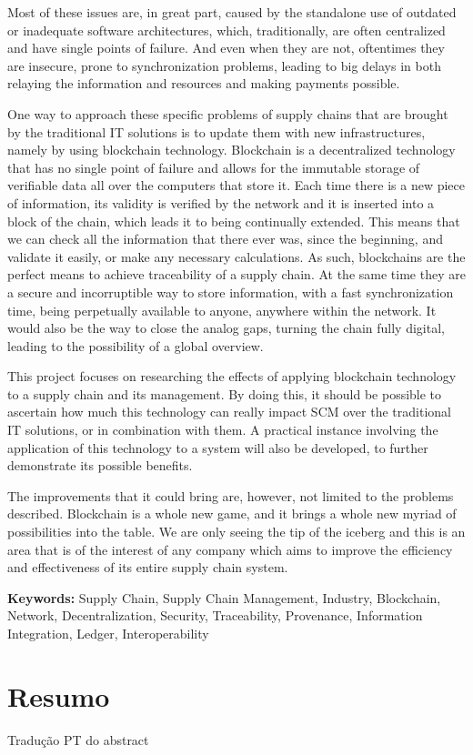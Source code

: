 Most of these issues are, in great part, caused by the standalone use of outdated or inadequate software architectures, which, traditionally, are often centralized and have single points of failure. And even when they are not, oftentimes they are insecure, prone to synchronization problems, leading to big delays in both relaying the information and resources and making payments possible. 

One way to approach these specific problems of supply chains that are brought by the traditional IT solutions is to update them with new infrastructures, namely by using blockchain technology. Blockchain is a decentralized technology that has no single point of failure and allows for the immutable storage of verifiable data all over the computers that store it. Each time there is a new piece of information, its validity is verified by the network and it is inserted into a block of the chain, which leads it to being continually extended. This means that we can check all the information that there ever was, since the beginning, and validate it easily, or make any necessary calculations. As such, blockchains are the perfect means to achieve traceability of a supply chain. At the same time they are a secure and incorruptible way to store information, with a fast synchronization time, being perpetually available to anyone, anywhere within the network. It would also be the way to close the analog gaps, turning the chain fully digital, leading to the possibility of a global overview.

This project focuses on researching the effects of applying blockchain technology to a supply chain and its management. By doing this, it should be possible to ascertain how much this technology can really impact SCM over the traditional IT solutions, or in combination with them. A practical instance involving the application of this technology to a system will also be developed, to further demonstrate its possible benefits.

The improvements that it could bring are, however, not limited to the problems described. Blockchain is a whole new game, and it brings a whole new myriad of possibilities into the table. We are only seeing the tip of the iceberg and this is an area that is of the interest of any company which aims to improve the efficiency and effectiveness of its entire supply chain system.

\textbf{Keywords:} Supply Chain, Supply Chain Management, Industry, Blockchain, Network, Decentralization, Security, Traceability, Provenance, Information Integration, Ledger, Interoperability


\chapter{Resumo}

Tradução PT do abstract




